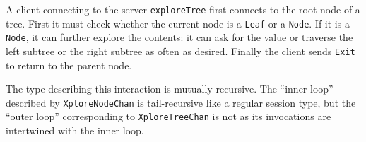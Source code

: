

A client connecting to the server \lstinline|exploreTree| first
connects to the root node of a tree. First it must check whether the
current node is a \lstinline|Leaf| or a \lstinline|Node|. If it is a
\lstinline|Node|, it can further explore the contents: it can ask for
the value or traverse the left subtree or the right subtree as often
as desired. Finally the client sends \lstinline|Exit| to return to the
parent node. 

The type describing this interaction is mutually recursive. The
``inner loop'' described by \lstinline|XploreNodeChan| is
tail-recursive like a regular session type, but the ``outer loop''
corresponding to \lstinline|XploreTreeChan| is not as its invocations
are intertwined with the inner loop.


% 



% 




